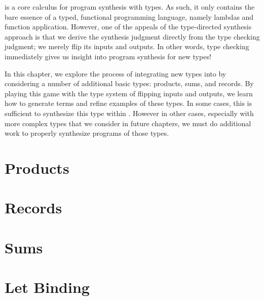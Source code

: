\lsyn{} is a core calculus for program synthesis with types.
As such, it only contains the bare essence of a typed, functional programming language, namely lambdas and function application.
However, one of the appeals of the type-directed synthesis approach is that we derive the synthesis judgment directly from the type checking judgment; we merely flip its inputs and outputs.
In other words, type checking immediately gives us insight into program synthesis for new types!

In this chapter, we explore the process of integrating new types into \lsyn{} by considering a number of additional basic types: products, sums, and records.
By playing this game with the type system of flipping inputs and outputs, we learn how to generate terms and refine examples of these types.
In some cases, this is sufficient to synthesize this type within \lsyn{}.
However in other cases, especially with more complex types that we consider in future chapters, we must do additional work to properly synthesize programs of those types.


\section{Products}



\section{Records}



\section{Sums}




\section{Let Binding}
